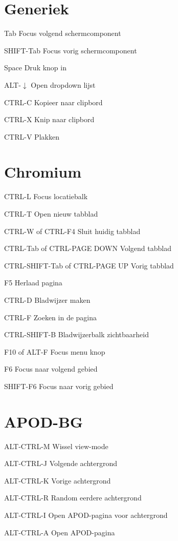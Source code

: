 \documentclass[10pt]{article}
\begin{document}
\begin{multicols}{3}
	\section{Generiek}
	\begin{ttdesc}[labelwidth=\widthof{\texttt{SHIFT+Tab}}]
	\item[Tab] Focus volgend schermcomponent
	\item[SHIFT-Tab] Focus vorig schermcomponent
	\item[Space] Druk knop in
	\item[ALT-$\downarrow$] Open dropdown lijst
	\item[CTRL-C] Kopieer naar clipbord
	\item[CTRL-X] Knip naar clipbord
	\item[CTRL-V] Plakken
	\end{ttdesc}
	\section{Chromium}
	\begin{ttdesc}[labelwidth=\widthof{\texttt{CTRL+SHIFT-Tab}}]
	\item[CTRL-L] Focus locatiebalk
	\item[CTRL-T] Open nieuw tabblad
	\item[CTRL-W of CTRL-F4] Sluit huidig tabblad
	\item[CTRL-Tab of CTRL-PAGE DOWN] Volgend tabblad
	\item[CTRL-SHIFT-Tab of CTRL-PAGE UP] Vorig tabblad
	\item[F5] Herlaad pagina
	\item[CTRL-D] Bladwijzer maken
	\item[CTRL-F] Zoeken in de pagina
	\item[CTRL-SHIFT-B] Bladwijzerbalk zichtbaarheid
	\item[F10 of ALT-F] Focus menu knop
	\item[F6] Focus naar volgend gebied
	\item[SHIFT-F6] Focus naar vorig gebied
	\end{ttdesc}
	\section{APOD-BG}
	\begin{ttdesc}[labelwidth=\widthof{\texttt{WIN-SHIFT+E}}]
	\item[ALT-CTRL-M] Wissel view-mode
	\item[ALT-CTRL-J] Volgende achtergrond
	\item[ALT-CTRL-K] Vorige achtergrond
	\item[ALT-CTRL-R] Random eerdere achtergrond
	\item[ALT-CTRL-I] Open APOD-pagina voor achtergrond
	\item[ALT-CTRL-A] Open APOD-pagina
	\end{ttdesc}


\end{multicols}
\end{document}
